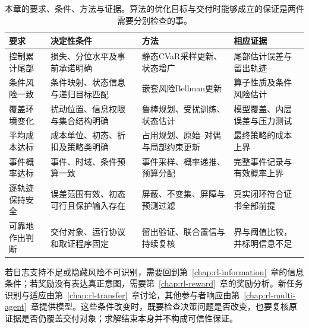 \begin{table}[t]
  \centering
  \begin{tabularx}{\linewidth}{@{}>{\raggedright\arraybackslash}p{22mm}XXX@{}}
    \toprule
    要求 & 决定性条件 & 方法 & 相应证据 \\
    \midrule
    控制累计尾部 & 损失、分位水平及事前承诺明确 & 静态CVaR采样更新、状态增广 & 尾部估计误差与留出轨迹 \\
    条件风险一致 & 条件映射、状态信息与递归目标匹配 & 嵌套风险Bellman更新 & 算子性质及条件风险估计 \\
    覆盖环境变化 & 扰动位置、信息权限与集合结构明确 & 鲁棒规划、受扰训练、状态估计 & 模型覆盖、内层误差与压力测试 \\
    平均成本达标 & 成本单位、初态、折扣及策略类明确 & 占用规划、原始--对偶与局部约束更新 & 最终策略的成本上界 \\
    事件概率达标 & 事件、时域、条件预算一致 & 事件采样、概率递推、预算分配 & 完整事件记录与有效概率上界 \\
    逐轨迹保持安全 & 误差范围有效、初态可行且保护输入存在 & 屏蔽、不变集、屏障与预测过滤 & 真实闭环符合证书全部前提 \\
    可靠地作出判断 & 交付对象、运行协议和取证程序固定 & 留出验证、联合置信与持续复核 & 界与阈值比较，并标明信息不足 \\
    \bottomrule
  \end{tabularx}
  \caption{本章的要求、条件、方法与证据。算法的优化目标与交付时能够成立的保证是两件需要分别检查的事。}
  \label{tab:rl-trustworthy-summary}
\end{table}

若日志支持不足或隐藏风险不可识别，需要回到第~\ref{chap:rl-information}~章的信息条件；若奖励没有表达真正意图，需要第~\ref{chap:rl-reward}~章的奖励分析。新任务识别与适应由第~\ref{chap:rl-transfer}~章讨论，其他参与者响应由第~\ref{chap:rl-multi-agent}~章提供模型。这些条件改变时，既要检查决策问题是否改变，也要复核原证据是否仍覆盖交付对象；求解结束本身并不构成可信性保证。
